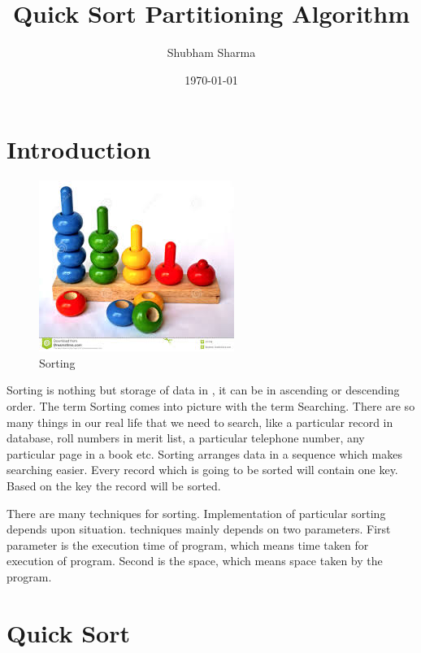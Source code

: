 \documentclass[12pt]{article}
\title{Quick Sort Partitioning Algorithm}
\author{Shubham Sharma}
\date{\today}
\begin{document}
\maketitle
\tableofcontents
\listoftables
\listoffigures
\newpage
\section{Introduction}
\begin{figure}[h]
        \begin{center}
                \includegraphics[width=0.7\columnwidth]{index1}
        \end{center}
        \caption{Sorting}
        \label{fig:shapes}
\end{figure}
 
\par Sorting is nothing but storage of data in , it can be in ascending or descending order. The term Sorting comes into picture with the term Searching. There are so many things in our real life that we need to search, like a particular record in database, roll numbers in merit list, a particular telephone number, any particular page in a book etc. Sorting arranges data in a sequence which makes searching easier. Every record which is going to be sorted will contain one key. Based on the key the record will be sorted.
\par There are many techniques for sorting. Implementation of particular sorting  depends upon situation.  techniques mainly depends on two parameters. First parameter is the execution time of program, which means time taken for execution of program. Second is the space, which means space taken by the program\cite{Wiki}.
\newpage
\section{Quick Sort}
\end{document}
